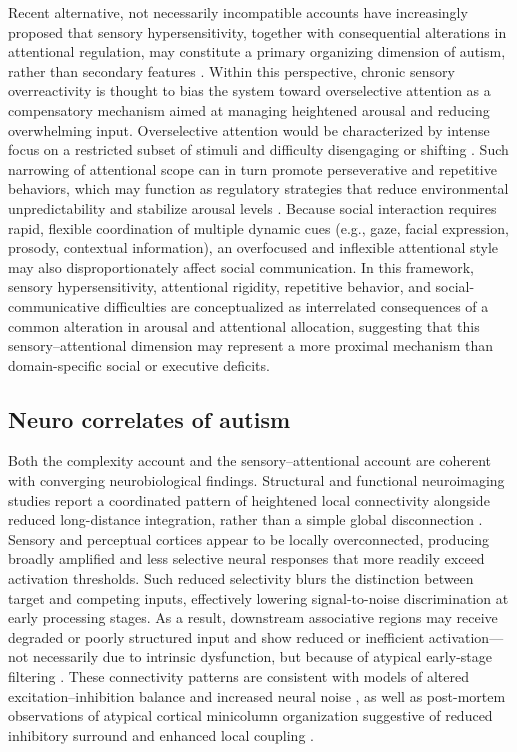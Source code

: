 \documentclass{article}
\begin{document}
Recent alternative, not necessarily incompatible accounts have increasingly proposed that sensory hypersensitivity, together with consequential alterations in attentional regulation, may constitute a primary organizing dimension of autism, rather than secondary features \citep{Kinsbourne1991,Liss2006}. Within this perspective, chronic sensory overreactivity is thought to bias the system toward overselective attention as a compensatory mechanism aimed at managing heightened arousal and reducing overwhelming input. Overselective attention would be characterized by intense focus on a restricted subset of stimuli and difficulty disengaging or shifting \citep{Liss2006}. Such narrowing of attentional scope can in turn promote perseverative and repetitive behaviors, which may function as regulatory strategies that reduce environmental unpredictability and stabilize arousal levels \citep{Kinsbourne1991,Liss2006}. Because social interaction requires rapid, flexible coordination of multiple dynamic cues (e.g., gaze, facial expression, prosody, contextual information), an overfocused and inflexible attentional style may also disproportionately affect social communication. In this framework, sensory hypersensitivity, attentional rigidity, repetitive behavior, and social-communicative difficulties are conceptualized as interrelated consequences of a common alteration in arousal and attentional allocation, suggesting that this sensory–attentional dimension may represent a more proximal mechanism than domain-specific social or executive deficits.

\subsection{Neuro correlates of autism}

Both the complexity account and the sensory–attentional account are coherent with converging neurobiological findings. Structural and functional neuroimaging studies report a coordinated pattern of heightened local connectivity alongside reduced long-distance integration, rather than a simple global disconnection \citep{Just2007,Belmonte2004}. Sensory and perceptual cortices appear to be locally overconnected, producing broadly amplified and less selective neural responses that more readily exceed activation thresholds. Such reduced selectivity blurs the distinction between target and competing inputs, effectively lowering signal-to-noise discrimination at early processing stages. As a result, downstream associative regions may receive degraded or poorly structured input and show reduced or inefficient activation—not necessarily due to intrinsic dysfunction, but because of atypical early-stage filtering \citep{Belmonte2004}. These connectivity patterns are consistent with models of altered excitation–inhibition balance and increased neural noise \citep{Hussman2001}, as well as post-mortem observations of atypical cortical minicolumn organization suggestive of reduced inhibitory surround and enhanced local coupling \citep{Casanova2002}.
\end{document}
